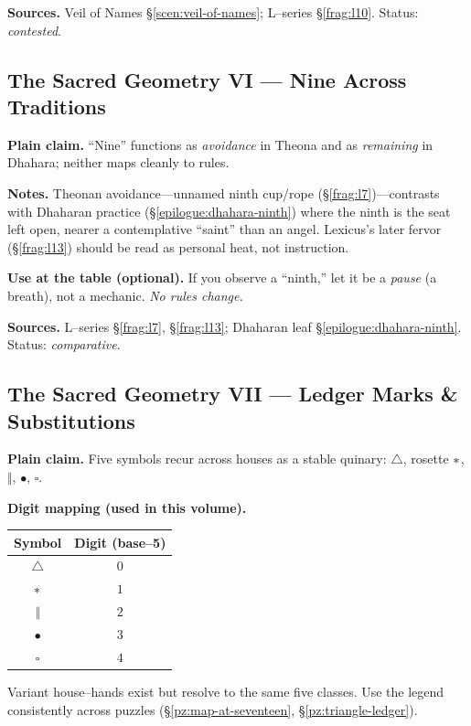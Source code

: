 \documentclass[11pt]{article}
\begin{document}
\begin{itemize}
\medskip
\noindent\textbf{Sources.} Veil of Names \S\ref{scen:veil-of-names}; L–series \S\ref{frag:l10}. Status: \emph{contested}.

\subsection{The Sacred Geometry VI — Nine Across Traditions}
\label{geometry:nine}

\noindent\textbf{Plain claim.} “Nine” functions as \emph{avoidance} in Theona and as \emph{remaining} in Dhahara; neither maps cleanly to rules.

\medskip
\noindent\textbf{Notes.} Theonan avoidance—unnamed ninth cup/rope (\S\ref{frag:l7})—contrasts with Dhaharan practice (\S\ref{epilogue:dhahara-ninth}) where the ninth is the seat left open, nearer a contemplative “saint” than an angel. Lexicus’s later fervor (\S\ref{frag:l13}) should be read as personal heat, not instruction.

\medskip
\noindent\textbf{Use at the table (optional).} If you observe a “ninth,” let it be a \emph{pause} (a breath), not a mechanic. \emph{No rules change.}

\medskip
\noindent\textbf{Sources.} L–series \S\ref{frag:l7}, \S\ref{frag:l13}; Dhaharan leaf \S\ref{epilogue:dhahara-ninth}. Status: \emph{comparative}.

\subsection{The Sacred Geometry VII — Ledger Marks \& Substitutions}
\label{geometry:ledger-marks}

\noindent\textbf{Plain claim.} Five symbols recur across houses as a stable quinary: \(\triangle\), rosette \(\large\ast\), \(\Vert\), \(\bullet\), \(\square\).

\medskip
\noindent\textbf{Digit mapping (used in this volume).}
\begin{center}
\begin{tabular}{c|c}
\textbf{Symbol} & \textbf{Digit (base–5)} \\
\hline
\(\triangle\) & \(0\) \\
\(\large\ast\) & \(1\) \\
\(\Vert\) & \(2\) \\
\(\bullet\) & \(3\) \\
\(\square\) & \(4\) \\
\end{tabular}
\end{center}
Variant house–hands exist but resolve to the same five classes. Use the legend consistently across puzzles (\S\ref{pz:map-at-seventeen}, \S\ref{pz:triangle-ledger}).


\end{itemize}
\end{document}
